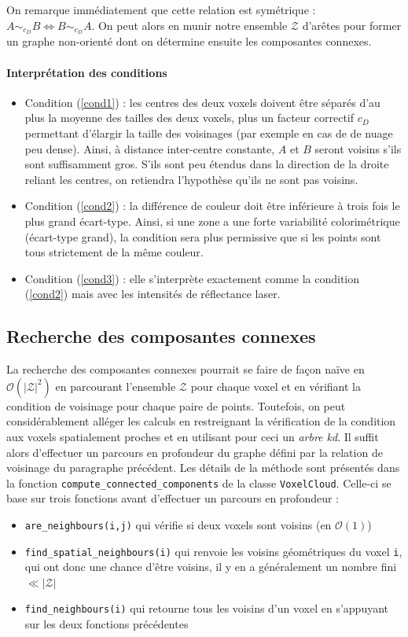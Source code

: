 \documentclass[a4paper, onecolumn, 11pt]{article}
\begin{document}
On remarque immédiatement que cette relation est symétrique : $A \sim_{c_D} B \Leftrightarrow B \sim_{c_D} A$. On peut alors en munir notre ensemble $\mathcal{Z}$ d'arêtes pour former un graphe non-orienté dont on détermine ensuite les composantes connexes.

\paragraph*{Interprétation des conditions}
\begin{itemize}
\item Condition (\ref{cond1}) : les centres des deux voxels doivent être séparés d'au plus la moyenne des tailles des deux voxels, plus un facteur correctif $c_D$ permettant d'élargir la taille des voisinages (par exemple en cas de de nuage peu dense). Ainsi, à distance inter-centre constante, $A$ et $B$ seront voisins s'ils sont suffisamment gros. S'ils sont peu étendus dans la direction de la droite reliant les centres, on retiendra l'hypothèse qu'ils ne sont pas voisins.
\item Condition (\ref{cond2}) : la différence de couleur doit être inférieure à trois fois le plus grand écart-type. Ainsi, si une zone a une forte variabilité colorimétrique (écart-type grand), la condition sera plus permissive que si les points sont tous strictement de la même couleur.
\item Condition (\ref{cond3}) : elle s'interprète exactement comme la condition (\ref{cond2}) mais avec les intensités de réflectance laser.
\end{itemize}

\subsection{Recherche des composantes connexes}
La recherche des composantes connexes pourrait se faire de façon naïve en $\mathcal{O}(|\mathcal{Z}|^2)$ en parcourant l'ensemble $\mathcal{Z}$ pour chaque voxel et en vérifiant la condition de voisinage pour chaque paire de points. Toutefois, on peut considérablement alléger les calculs en restreignant la vérification de la condition aux voxels spatialement proches et en utilisant pour ceci un \emph{arbre kd}. Il suffit alors d'effectuer un parcours en profondeur du graphe défini par la relation de voisinage du paragraphe précédent. Les détails de la méthode sont présentés dans la fonction \texttt{compute\_connected\_components} de la classe \texttt{VoxelCloud}. Celle-ci se base sur trois fonctions avant d'effectuer un parcours en profondeur :
\begin{itemize}
    \item \texttt{are\_neighbours(i,j)} qui vérifie si deux voxels sont voisins (en $\mathcal{O}(1)$)
    \item \texttt{find\_spatial\_neighbours(i)} qui renvoie les voisins géométriques du voxel \texttt{i}, qui ont donc une chance d'être voisins, il y en a généralement un nombre fini $\ll |\mathcal{Z}|$
    \item \texttt{find\_neighbours(i)} qui retourne tous les voisins d'un voxel en s'appuyant sur les deux fonctions précédentes
\end{itemize}
\end{document}
